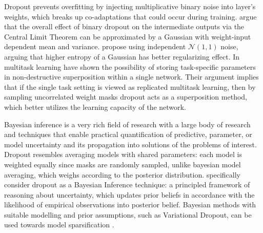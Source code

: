 \documentclass[a4paper,10pt]{article}
\begin{document}
Dropout \citep{hinton_improving_2012} prevents overfitting by injecting multiplicative
binary noise into layer's weights, which breaks up co-adaptations that could occur
during training. \citet{wang_fast_2013} argue that the overall effect of binary dropout
on the intermediate outputs via the Central Limit Theorem can be approximated by a Gaussian
with weight-input dependent mean and variance. \citet{srivastava_dropout_2014} propose
using independent $\mathcal{N}(1,1)$ noise, arguing that higher entropy of a Gaussian has
better regularizing effect. In multitask learning \citet{cheung_superposition_2019}
have shown the possibility of storing task-specific parameters in non-destructive superposition
within a single network. Their argument implies that if the single task setting is viewed
as replicated multitask learning, then by sampling uncorrelated weight masks dropout acts
as a superposition method, which better utilizes the learning capacity of the network.

Bayesian inference is a very rich field of research with a large body of research and
techniques that enable practical quantification of predictive, parameter, or model
uncertainty and its propagation into solutions of the problems of interest.
%
Dropout resembles averaging models with shared parameters: each model is weighted equally
since masks are randomly sampled, unlike bayesian model averaging, which weighs according to
the posterior distribution. \citet{kingma_variational_2015} specifically consider dropout
as a Bayesian Inference technique: a principled framework of reasoning about uncertainty,
which updates prior beliefs in accordance with the likelihood of empirical observations
into posterior belief. Bayesian methods with suitable modelling and prior assumptions, such
as Variational Dropout, can be used towards model sparsification
\citep{kingma_variational_2015,molchanov_variational_2017,kharitonov_variational_2018}.
\end{document}
